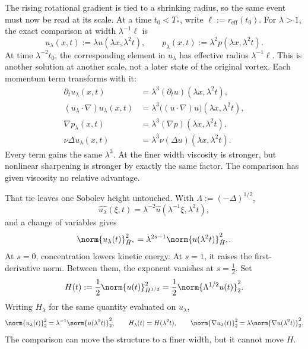 
The rising rotational gradient is tied to a shrinking radius, so the same event must now be read at its scale.
At a time \(t_0<T_*\), write \(\ell:=r_{\mathrm{eff}}(t_0)\).
For \(\lambda>1\), the exact \NavierStokes{} comparison at width \(\lambda^{-1}\ell\) is
\[
  u_\lambda(x,t)
  :=
  \lambda u(\lambda x,\lambda^2t),
  \qquad
  p_\lambda(x,t)
  :=
  \lambda^2p(\lambda x,\lambda^2t).
\]
At time \(\lambda^{-2}t_0\), the corresponding element in \(u_\lambda\) has effective radius \(\lambda^{-1}\ell\).
This is another solution at another scale, not a later state of the original vortex.
Each momentum term transforms with it:
\[
\begin{aligned}
  \partial_tu_\lambda(x,t)
  &=
  \lambda^3(\partial_tu)(\lambda x,\lambda^2t),
  \\
  (u_\lambda\cdot\nabla)u_\lambda(x,t)
  &=
  \lambda^3\bigl((u\cdot\nabla)u\bigr)(\lambda x,\lambda^2t),
  \\
  \nabla p_\lambda(x,t)
  &=
  \lambda^3(\nabla p)(\lambda x,\lambda^2t),
  \\
  \nu\Delta u_\lambda(x,t)
  &=
  \lambda^3\nu(\Delta u)(\lambda x,\lambda^2t).
\end{aligned}
\]
Every term gains the same \(\lambda^3\).
At the finer width viscosity is stronger, but nonlinear sharpening is stronger by exactly the same factor.
The comparison has given viscosity no relative advantage.


That tie leaves one Sobolev height untouched.
With \(\Lambda:=(-\Delta)^{1/2}\),
\[
  \widehat{u_\lambda}(\xi,t)
  =
  \lambda^{-2}\widehat u(\lambda^{-1}\xi,\lambda^2t),
\]
and a change of variables gives
\[
  \norm{u_\lambda(t)}_{\dot H^s}^2
  =
  \lambda^{2s-1}
  \norm{u(\lambda^2t)}_{\dot H^s}^2.
\]
At \(s=0\), concentration lowers kinetic energy.
At \(s=1\), it raises the first-derivative norm.
Between them, the exponent vanishes at \(s=\tfrac12\).
Set
\[
  H(t)
  :=
  \frac12\norm{u(t)}_{\dot H^{1/2}}^2
  =
  \frac12\norm{\Lambda^{1/2}u(t)}_2^2.
\]
Writing \(H_\lambda\) for the same quantity evaluated on \(u_\lambda\),
\[
  \norm{u_\lambda(t)}_2^2
  =
  \lambda^{-1}\norm{u(\lambda^2t)}_2^2,
  \qquad
  H_\lambda(t)=H(\lambda^2t),
  \qquad
  \norm{\nabla u_\lambda(t)}_2^2
  =
  \lambda\norm{\nabla u(\lambda^2t)}_2^2.
\]
The comparison can move the structure to a finer width, but it cannot move \(H\).


